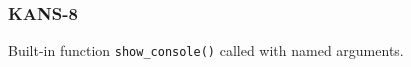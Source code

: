 \subsubsection{KANS-8}\label{sec:error_code_kans_8}

Built-in function \texttt{show\_console()} called with named arguments.


